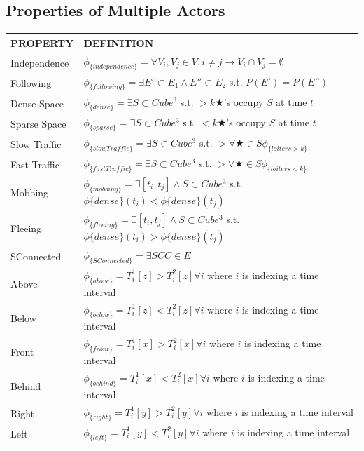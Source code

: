 \subsection{Properties of Multiple Actors}
\begin{tabular}{| p{2.8cm} | p{11.5cm} | }
\hline
PROPERTY & DEFINITION \\ \hline
 Independence& $\phi_{\{independence\}} =  \forall V_i,V_j \in V, i \neq j \rightarrow V_i \cap V_j = \emptyset $ \\ \hline
 Following & $\phi_{\{following\}} =  \exists E' \subset E_1 \land E'' \subset E_2$ s.t. $P(E')=P(E'') $  \\ \hline
 Dense Space & $\phi_{\{dense\}} = \exists S \subset Cube^3$ s.t. $> k \bigstar$'s occupy $S$ at time $t$\\ \hline
 Sparse Space & $\phi_{\{sparse\}} = \exists S \subset Cube^3$ s.t. $< k \bigstar$'s occupy $S$ at time $t$\\ \hline
 Slow Traffic& $\phi_{\{slowTraffic\}} = \exists S \subset Cube^3$ s.t. $> \forall \bigstar \in S \phi_{\{loiters>k\}}$ \\ \hline
 Fast Traffic & $\phi_{\{fastTraffic\}} = \exists S \subset Cube^3$ s.t. $> \forall \bigstar \in S \phi_{\{loiters<k\}}$ \\ \hline
 Mobbing& $\phi_{\{mobbing\}} = \exists [t_i, t_j] \land S \subset Cube^3$ s.t. $ \phi{\{dense\}}(t_i) < \phi{\{dense\}}(t_j)$ \\ \hline
 Fleeing& $\phi_{\{fleeing\}} = \exists [t_i, t_j] \land S \subset Cube^3$ s.t. $ \phi{\{dense\}}(t_i) > \phi{\{dense\}}(t_j)$ \\ \hline
 SConnected& $\phi_{\{SConnected\}} = \exists SCC \in E$ \\ \hline
 Above & $\phi_{\{above\}} =  T^1_i[z] > T^2_i[z] \forall i$ where $i$ is indexing a time interval\\ \hline
 Below & $\phi_{\{below\}} = T^1_i[z] < T^2_i[z]  \forall i$ where $i$ is indexing a time interval\\ \hline
 Front & $\phi_{\{front\}} = T^1_i[x] > T^2_i[x]  \forall i$ where $i$ is indexing a time interval\\ \hline
 Behind & $\phi_{\{behind\}} = T^1_i[x] < T^2_i[x]  \forall i$ where $i$ is indexing a time interval\\ \hline
 Right & $\phi_{\{right\}} = T^1_i[y] > T^2_i[y]  \forall i$ where $i$ is indexing a time interval \\ \hline
 Left & $\phi_{\{left\}} = T^1_i[y] < T^2_i[y]  \forall i$ where $i$ is indexing a time interval \\ \hline
\end{tabular}

